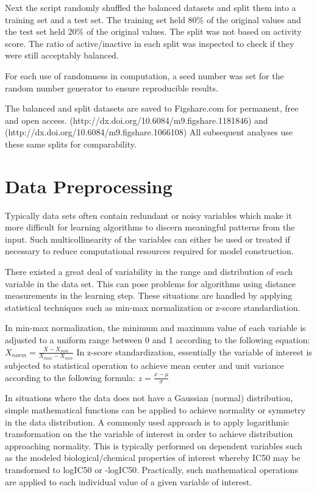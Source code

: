 Next the script randomly shuffled the balanced datasets and split them into a training set and a test set. The training set held 80\% of the original values and the test set held 20\% of the original values. The split was not based on activity score. The ratio of active/inactive in each split was inspected to check if they were still acceptably balanced.

For each use of randomness in computation, a seed number was set for the random number generator to ensure reproducible results.  

The balanced and split datasets are saved to Figshare.com for permanent, free and open access. (http://dx.doi.org/10.6084/m9.figshare.1181846) and \\
(http://dx.doi.org/10.6084/m9.figshare.1066108) All subsequent analyses use these same splits for comparability.

\section{Data Preprocessing}

Typically data sets often contain redundant or noisy variables which make it more difficult for learning algorithms to discern meaningful patterns from the input. Such multicollinearity of the variables can either be used or treated if necessary to reduce computational resources required for model construction. \cite{Nantasenamat2009}

There existed a great deal of variability in the range and distribution of each variable in the data set. This can pose problems for algorithms using distance measurements in the learning step. These situations are handled by applying statistical techniques such as min-max normalization or z-score standardiation. 

In min-max normalization, the minimum and maximum value of each variable is adjusted to a uniform range between 0 and 1 according to the following equation: $ X_{norm} = \frac{X - X_{min}}{X_{max} - X_{min}}  $ In z-score standardization, essentially the variable of interest is subjected to statistical operation to achieve mean center and unit variance according to the following formula: $ z = \frac{x - \mu}{\sigma}  $ \cite{Nantasenamat2009}

In situations where the data does not have a Gaussian (normal) distribution, simple mathematical functions can be applied to achieve normality or symmetry in the data distribution. A commonly used approach is to apply logarithmic transformation on the the variable of interest in order to achieve distribution approaching normality. This is typically performed on dependent variables such as the modeled biological/chemical properties of interest whereby IC50 may be transformed to logIC50 or -logIC50. Practically, such mathematical operations are applied to each individual value of a given variable of interest. \cite{Nantasenamat2009}

